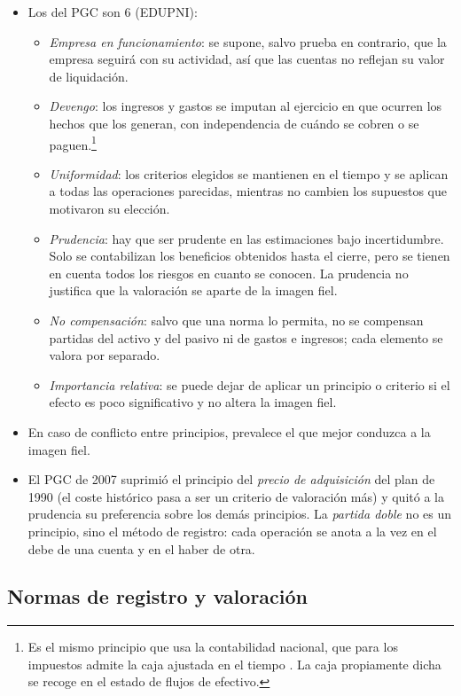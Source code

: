 \documentclass[11pt]{article}
\begin{document}
\begin{itemize}
\item Los  del PGC son 6 (EDUPNI):
  \begin{itemize}
  \item \emph{Empresa en funcionamiento}: se supone, salvo prueba en contrario, que la empresa seguirá con su actividad, así que las cuentas no reflejan su valor de liquidación.
  \item \emph{Devengo}: los ingresos y gastos se imputan al ejercicio en que ocurren los hechos que los generan, con independencia de cuándo se cobren o se paguen.\footnote{Es el mismo principio que usa la contabilidad nacional, que para los impuestos admite la caja ajustada en el tiempo . La caja propiamente dicha se recoge en el estado de flujos de efectivo.}
  \item \emph{Uniformidad}: los criterios elegidos se mantienen en el tiempo y se aplican a todas las operaciones parecidas, mientras no cambien los supuestos que motivaron su elección.
  \item \emph{Prudencia}: hay que ser prudente en las estimaciones bajo incertidumbre. Solo se contabilizan los beneficios obtenidos hasta el cierre, pero se tienen en cuenta todos los riesgos en cuanto se conocen. La prudencia no justifica que la valoración se aparte de la imagen fiel.
  \item \emph{No compensación}: salvo que una norma lo permita, no se compensan partidas del activo y del pasivo ni de gastos e ingresos; cada elemento se valora por separado.
  \item \emph{Importancia relativa}: se puede dejar de aplicar un principio o criterio si el efecto es poco significativo y no altera la imagen fiel.
  \end{itemize}
\item En caso de conflicto entre principios, prevalece el que mejor conduzca a la imagen fiel.
\item El PGC de 2007 suprimió el principio del \emph{precio de adquisición} del plan de 1990 (el coste histórico pasa a ser un criterio de valoración más) y quitó a la prudencia su preferencia sobre los demás principios. La \emph{partida doble} no es un principio, sino el método de registro: cada operación se anota a la vez en el debe de una cuenta y en el haber de otra.
\end{itemize}

\subsection{Normas de registro y valoración}\label{sec:normas-registro-valoracion}
\end{document}
